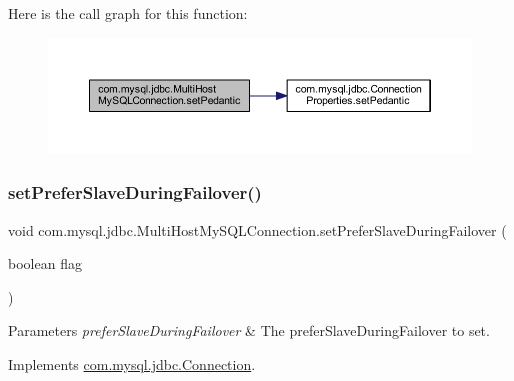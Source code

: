 Here is the call graph for this function\+:
\nopagebreak
\begin{figure}[H]
\begin{center}
\leavevmode
\includegraphics[width=350pt]{classcom_1_1mysql_1_1jdbc_1_1_multi_host_my_s_q_l_connection_a9e6d76a788879ee7f45d6407d89a63c0_cgraph}
\end{center}
\end{figure}
\mbox{\label{classcom_1_1mysql_1_1jdbc_1_1_multi_host_my_s_q_l_connection_a87204976d451f0fa0c086fea3bc3be73}} 
\subsubsection{\texorpdfstring{set\+Prefer\+Slave\+During\+Failover()}{setPreferSlaveDuringFailover()}}
{\footnotesize\ttfamily void com.\+mysql.\+jdbc.\+Multi\+Host\+My\+S\+Q\+L\+Connection.\+set\+Prefer\+Slave\+During\+Failover (\begin{DoxyParamCaption}\item[{boolean}]{flag }\end{DoxyParamCaption})}


\begin{DoxyParams}{Parameters}
{\em prefer\+Slave\+During\+Failover} & The prefer\+Slave\+During\+Failover to set. \\
\hline
\end{DoxyParams}


Implements \mbox{\hyperlink{interfacecom_1_1mysql_1_1jdbc_1_1_connection_af8c0ed78ccafd6088266b19481b85ce6}{com.\+mysql.\+jdbc.\+Connection}}.

